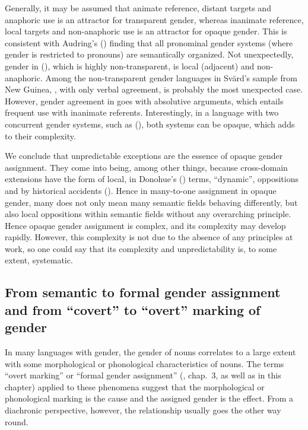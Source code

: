 \documentclass[output=collectionpaper]{langsci/langscibook}
\begin{document}
Generally, it may be assumed that animate reference, distant targets and anaphoric use is an attractor for transparent gender, whereas inanimate reference, local targets and non-anaphoric use is an attractor for opaque gender. This is consistent with Audring's (\citeyear{Audring2009a}) finding that all pronominal gender systems (where gender is restricted to pronouns) are semantically organized. Not unexpectedly, gender in  (), which is highly non-transparent, is local (adjacent) and non-anaphoric. Among the non-transparent gender languages in Svärd's sample from New Guinea, , with only verbal agreement, is probably the most unexpected case. However, gender agreement in  goes with absolutive arguments, which entails frequent use with inanimate referents. Interestingly, in a language with two concurrent gender systems, such as  (\citealt{Aikhenvald2010}), both systems can be opaque, which adds to their complexity.

We conclude that unpredictable exceptions are the essence of opaque gender assignment. They come into being, among other things, because cross-domain extensions have the form of local, in Donohue's (\citeyear{Donohue2004}) terms, ``dynamic'', oppositions and by historical accidents (\citealt{Seifart2018}). Hence in many-to-one assignment in opaque gender, many does not only mean many semantic fields behaving differently, but also local oppositions within semantic fields without any overarching principle. Hence opaque gender assignment is complex, and its complexity may develop rapidly. However, this complexity is not due to the absence of any principles at work, so one could say that its complexity and unpredictability is, to some extent, systematic.

  \subsection{From semantic to formal gender assignment and from ``covert'' to ``overt'' marking of gender}
\label{sec:WDG:6.4}

In many languages with gender, the gender of nouns correlates to a large extent with some morphological or phonological characteristics of nouns. The terms ``overt marking'' or ``formal gender assignment'' (\citealt{Corbett1991}, chap.~3, as well as  in this chapter) applied to these phenomena suggest that the morphological or phonological marking is the cause and the assigned gender is the effect. From a diachronic perspective, however, the relationship usually goes the other way round.
\end{document}
